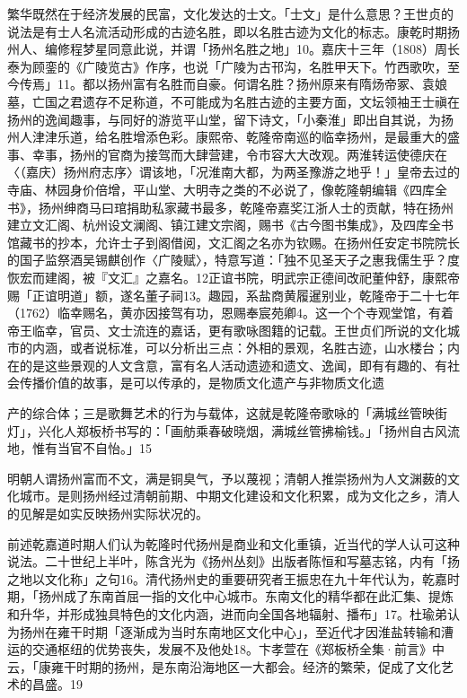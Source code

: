 繁华既然在于经济发展的民富，文化发达的士文。「士文」是什么意思？王世贞的说法是有士人名流活动形成的古迹名胜，即以名胜古迹为文化的标志。康乾时期扬州人、编修程梦星同意此说，并谓「扬州名胜之地」10。嘉庆十三年（1808）周长泰为顾銮的《广陵览古》作序，也说「广陵为古邗沟，名胜甲天下。竹西歌吹，至今传焉」11。都以扬州富有名胜而自豪。何谓名胜？扬州原来有隋炀帝冢、袁娘墓，亡国之君遗存不足称道，不可能成为名胜古迹的主要方面，文坛领袖王士禛在扬州的逸闻趣事，与同好的游览平山堂，留下诗文，「小秦淮」即出自其说，为扬州人津津乐道，给名胜增添色彩。康熙帝、乾隆帝南巡的临幸扬州，是最重大的盛事、幸事，扬州的官商为接驾而大肆营建，令市容大大改观。两淮转运使德庆在〈（嘉庆）扬州府志序〉谓该地，「况淮南大都，为两圣豫游之地乎！」皇帝去过的寺庙、林园身价倍增，平山堂、大明寺之类的不必说了，像乾隆朝编辑《四库全书》，扬州绅商马曰琯捐助私家藏书最多，乾隆帝嘉奖江浙人士的贡献，特在扬州建立文汇阁、杭州设文澜阁、镇江建文宗阁，赐书《古今图书集成》，及四库全书馆藏书的抄本，允许士子到阁借阅，文汇阁之名亦为钦赐。在扬州任安定书院院长的国子监祭酒吴锡麒创作〈广陵赋〉，特意写道：「独不见圣天子之惠我儒生乎？度恢宏而建阁，被『文汇』之嘉名。12正谊书院，明武宗正德间改祀董仲舒，康熙帝赐「正谊明道」额，遂名董子祠13。趣园，系盐商黄履暹别业，乾隆帝于二十七年（1762）临幸赐名，黄亦因接驾有功，恩赐奉宸苑卿4。这一个个寺观堂馆，有着帝王临幸，官员、文士流连的嘉话，更有歌咏图籍的记载。王世贞们所说的文化城市的内涵，或者说标准，可以分析出三点：外相的景观，名胜古迹，山水楼台；内在的是这些景观的人文含意，富有名人活动遗迹和遗文、逸闻，即有有趣的、有社会传播价值的故事，是可以传承的，是物质文化遗产与非物质文化遗

\vfill
\begin{BookNotes}
\end{BookNotes}

\noindent 产的综合体；三是歌舞艺术的行为与载体，这就是乾隆帝歌咏的「满城丝管映街灯」，兴化人郑板桥书写的：「画舫乘春破晓烟，满城丝管拂榆钱。」「扬州自古风流地，惟有当官不自怡。」15

明朝人谓扬州富而不文，满是铜臭气，予以蔑视；清朝人推崇扬州为人文渊薮的文化城市。是则扬州经过清朝前期、中期文化建设和文化积累，成为文化之乡，清人的见解是如实反映扬州实际状况的。

前述乾嘉道时期人们认为乾隆时代扬州是商业和文化重镇，近当代的学人认可这种说法。二十世纪上半叶，陈含光为《扬州丛刻》出版者陈恒和写墓志铭，内有「扬之地以文化称」之句16。清代扬州史的重要研究者王振忠在九十年代认为，乾嘉时期，「扬州成了东南首屈一指的文化中心城市。东南文化的精华都在此汇集、提炼和升华，并形成独具特色的文化内涵，进而向全国各地辐射、播布」17。杜瑜弟认为扬州在雍干时期「逐渐成为当时东南地区文化中心」，至近代才因淮盐转输和漕运的交通枢纽的优势丧失，发展不及他处18。卞孝萱在《郑板桥全集·前言》中云，「康雍干时期的扬州，是东南沿海地区一大都会。经济的繁荣，促成了文化艺术的昌盛。19

